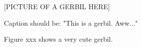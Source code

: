 \documentclass{article}
\begin{document}

[PICTURE OF A GERBIL HERE]

Caption should be: "This is a gerbil. Aww..."

Figure xxx shows a very cute gerbil.

\end{document}

